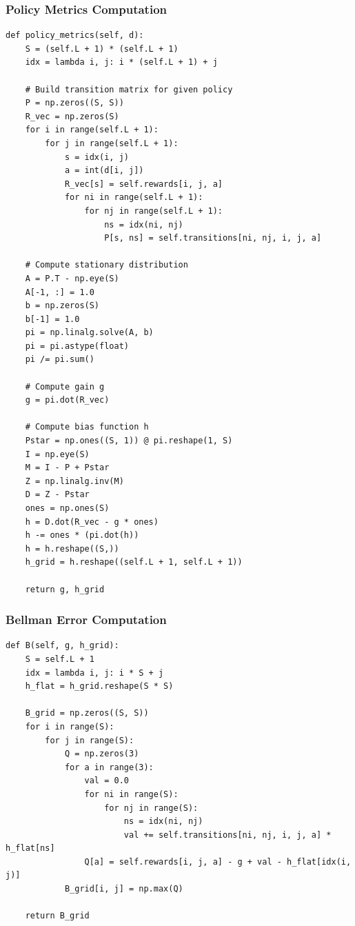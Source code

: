 \documentclass[12pt]{article}
\begin{document}
\subsubsection{Policy Metrics Computation}
\begin{lstlisting}[caption=Policy Metrics Computation for Average Reward Analysis]
def policy_metrics(self, d):
    S = (self.L + 1) * (self.L + 1)
    idx = lambda i, j: i * (self.L + 1) + j
    
    # Build transition matrix for given policy
    P = np.zeros((S, S))
    R_vec = np.zeros(S)
    for i in range(self.L + 1):
        for j in range(self.L + 1):
            s = idx(i, j)
            a = int(d[i, j])
            R_vec[s] = self.rewards[i, j, a]
            for ni in range(self.L + 1):
                for nj in range(self.L + 1):
                    ns = idx(ni, nj)
                    P[s, ns] = self.transitions[ni, nj, i, j, a]
    
    # Compute stationary distribution
    A = P.T - np.eye(S)
    A[-1, :] = 1.0
    b = np.zeros(S)
    b[-1] = 1.0
    pi = np.linalg.solve(A, b)
    pi = pi.astype(float)
    pi /= pi.sum()
    
    # Compute gain g
    g = pi.dot(R_vec)
    
    # Compute bias function h
    Pstar = np.ones((S, 1)) @ pi.reshape(1, S)
    I = np.eye(S)
    M = I - P + Pstar
    Z = np.linalg.inv(M)
    D = Z - Pstar
    ones = np.ones(S)
    h = D.dot(R_vec - g * ones)
    h -= ones * (pi.dot(h))
    h = h.reshape((S,))
    h_grid = h.reshape((self.L + 1, self.L + 1))
    
    return g, h_grid
\end{lstlisting}

\subsubsection{Bellman Error Computation}
\begin{lstlisting}[caption={Bellman Error $B(g,h)$ Computation}]
def B(self, g, h_grid):
    S = self.L + 1
    idx = lambda i, j: i * S + j
    h_flat = h_grid.reshape(S * S)
    
    B_grid = np.zeros((S, S))
    for i in range(S):
        for j in range(S):
            Q = np.zeros(3)
            for a in range(3):
                val = 0.0
                for ni in range(S):
                    for nj in range(S):
                        ns = idx(ni, nj)
                        val += self.transitions[ni, nj, i, j, a] * h_flat[ns]
                Q[a] = self.rewards[i, j, a] - g + val - h_flat[idx(i, j)]
            B_grid[i, j] = np.max(Q)
    
    return B_grid
\end{lstlisting}
\end{document}
